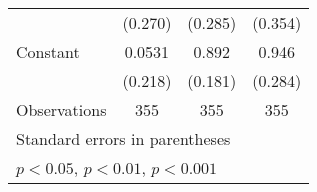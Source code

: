 {\begin{tabular}{l*{3}{c}}
                    &     (0.270)         &     (0.285)         &     (0.354)         \\
[1em]
Constant            &      0.0531         &       0.892\sym{***}&       0.946\sym{**} \\
                    &     (0.218)         &     (0.181)         &     (0.284)         \\
\hline
Observations        &         355         &         355         &         355         \\
\hline\hline
\multicolumn{4}{l}{\footnotesize Standard errors in parentheses}\\
\multicolumn{4}{l}{\footnotesize \sym{*} \(p<0.05\), \sym{**} \(p<0.01\), \sym{***} \(p<0.001\)}\\
\end{tabular}
}

